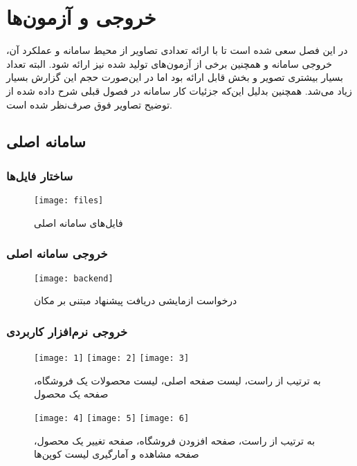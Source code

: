 \chapter{خروجی و آزمون‌ها}

در این فصل سعی شده است تا با ارائه تعدادی تصاویر از محیط سامانه و عملکرد آن، خروجی سامانه و همچنین برخی از آزمون‌های تولید شده نیز ارائه شود. البته تعداد بسیار بیشتری تصویر و بخش قابل ارائه بود اما در این‌صورت حجم این گزارش بسیار زیاد می‌شد. همچنین  بدلیل این‌که جزئیات کار سامانه در فصول قبلی شرح داده شده از توضیح تصاویر فوق صرف‌نظر شده است.

\section{سامانه اصلی}

\subsection{ساختار فایل‌ها}

\begin{figure}[H]
	\centering
	\texttt{[image: files]}
	\caption{فایل‌های سامانه اصلی}
	\label{fig:files}
\end{figure}

\subsection{خروجی سامانه اصلی}

\begin{figure}[H]
	\centering
	\texttt{[image: backend]}
	\caption{درخواست ازمایشی دریافت پیشنهاد مبتنی بر مکان}
	\label{fig:backend}
\end{figure}


\newpage

\subsection{خروجی نرم‌افزار کاربردی}

\begin{figure}[H]
	\centering
	\texttt{[image: 1]}
	\texttt{[image: 2]}
	\texttt{[image: 3]}
	\caption{به ترتیب از راست، لیست صفحه اصلی، لیست محصولات یک فروشگاه، صفحه یک محصول}
	\label{fig:app1}
\end{figure}

\begin{figure}[H]
	\centering
	\texttt{[image: 4]}
	\texttt{[image: 5]}
	\texttt{[image: 6]}
	\caption{به ترتیب از راست، صفحه افزودن فروشگاه، صفحه تغییر یک محصول، صفحه مشاهده و آمارگیری لیست کوپن‌ها}
	\label{fig:app2}
\end{figure}

